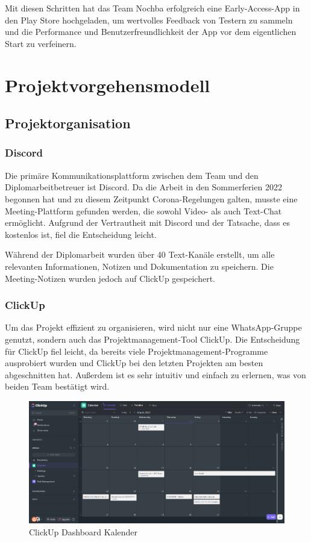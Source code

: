 Mit diesen Schritten hat das Team Nochba erfolgreich eine Early-Access-App in den Play Store hochgeladen, um wertvolles Feedback von Testern zu sammeln und die Performance und Benutzerfreundlichkeit der App vor dem eigentlichen Start zu verfeinern.

\section{Projektvorgehensmodell}
\subsection{Projektorganisation}

\subsubsection{Discord}
Die primäre Kommunikationsplattform zwischen dem Team und den Diplomarbeitbetreuer ist Discord. Da die Arbeit in den Sommerferien 2022 begonnen hat und zu diesem Zeitpunkt Corona-Regelungen galten, musste eine Meeting-Plattform gefunden werden, die sowohl Video- als auch Text-Chat ermöglicht. Aufgrund der Vertrautheit mit Discord und der Tatsache, dass es kostenlos ist, fiel die Entscheidung leicht.

Während der Diplomarbeit wurden über 40 Text-Kanäle erstellt, um alle relevanten Informationen, Notizen und Dokumentation zu speichern. Die Meeting-Notizen wurden jedoch auf ClickUp gespeichert.
\subsubsection{ClickUp}
Um das Projekt effizient zu organisieren, wird nicht nur eine WhatsApp-Gruppe genutzt, sondern auch das Projektmanagement-Tool ClickUp. Die Entscheidung für ClickUp fiel leicht, da bereits viele Projektmanagement-Programme ausprobiert wurden und ClickUp bei den letzten Projekten am besten abgeschnitten hat. Außerdem ist es sehr intuitiv und einfach zu erlernen, was von beiden Team bestätigt wird.

\begin{figure}
    \centering
    \includegraphics[width=1\textwidth]{./pics/clickup-calender-view.png}
    \caption{ClickUp Dashboard Kalender}
    \label{fig:clickup-calendar}
\end{figure}


